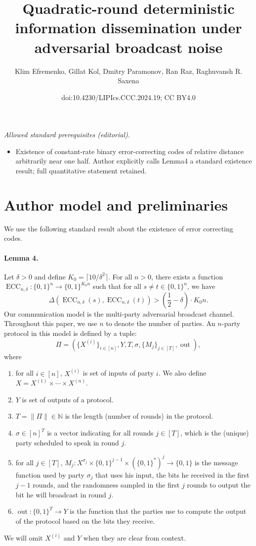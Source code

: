 \documentclass[10pt,a4paper]{article}
\title{Quadratic-round deterministic information dissemination under adversarial broadcast noise}
\author{Klim Efremenko, Gillat Kol, Dmitry Paramonov, Ran Raz, Raghuvansh R. Saxena}
\date{doi:10.4230/LIPIcs.CCC.2024.19; CC BY4.0}
\begin{document}
\maketitle
\noindent\textit{Allowed standard prerequisites (editorial).}\begin{itemize}
\item Existence of constant-rate binary error-correcting codes of relative distance arbitrarily near one half. Author explicitly calls Lemma4 a standard existence result; full quantitative statement retained.
\end{itemize}\medskip
\section*{Author model and preliminaries}
We use the following standard result about the existence of error correcting codes.
\paragraph{Lemma 4.} Let $\delta>0$ and define $K_0=\lceil10/\delta^2\rceil$. For all $n>0$, there exists a function $\operatorname{ECC}_{n,\delta}:\{0,1\}^n\to\{0,1\}^{K_0 n}$ such that for all $s\ne t\in\{0,1\}^n$, we have
\[\Delta(\operatorname{ECC}_{n,\delta}(s),\operatorname{ECC}_{n,\delta}(t))>\left(\frac12-\delta\right)\cdot K_0 n.\]
Our communication model is the multi-party adversarial broadcast channel. Throughout this paper, we use $n$ to denote the number of parties. An $n$-party protocol in this model is defined by a tuple:
\[\Pi=\left(\{X^{(i)}\}_{i\in[n]},Y,T,\sigma,\{M_j\}_{j\in[T]},\operatorname{out}\right),\]
where
\begin{enumerate}
\item for all $i\in[n]$, $X^{(i)}$ is set of inputs of party $i$. We also define $X=X^{(1)}\times\cdots\times X^{(n)}$.
\item $Y$ is set of outputs of a protocol.
\item $T=\|\Pi\|\in\mathbb N$ is the length (number of rounds) in the protocol.
\item $\sigma\in[n]^T$ is a vector indicating for all rounds $j\in[T]$, which is the (unique) party scheduled to speak in round $j$.
\item for all $j\in[T]$, $M_j:X^{\sigma_j}\times\{0,1\}^{j-1}\times(\{0,1\}^*)^j\to\{0,1\}$ is the message function used by party $\sigma_j$ that uses his input, the bits he received in the first $j-1$ rounds, and the randomness sampled in the first $j$ rounds to output the bit he will broadcast in round $j$.
\item $\operatorname{out}:\{0,1\}^T\to Y$ is the function that the parties use to compute the output of the protocol based on the bits they receive.
\end{enumerate}
We will omit $X^{(i)}$ and $Y$ when they are clear from context.
\end{document}

